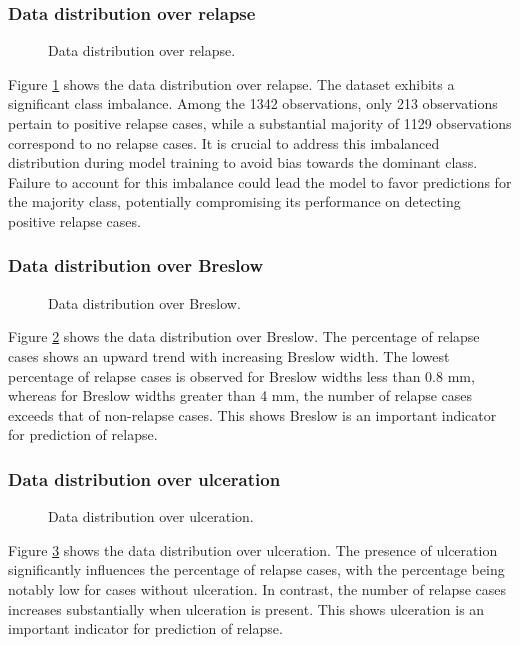 \documentclass[conference]{IEEEtran}
\begin{document}
\subsubsection{Data distribution over relapse}
\begin{figure}[h!]
  \centering
    
  \caption{Data distribution over relapse.}
  \label{fig:relapse}
\end{figure}
Figure \ref{fig:relapse} shows the data distribution over relapse. The dataset exhibits a significant class imbalance. Among the 1342 observations, only 213 observations pertain to positive relapse cases, while a substantial majority of 1129 observations correspond to no relapse cases. It is crucial to address this imbalanced distribution during model training to avoid bias towards the dominant class. Failure to account for this imbalance could lead the model to favor predictions for the majority class, potentially compromising its performance on detecting positive relapse cases.

\subsubsection{Data distribution over Breslow}
\begin{figure}[h!]
  \centering
    
  \caption{Data distribution over Breslow.}
  \label{fig:breslow}
\end{figure}

Figure \ref{fig:breslow} shows the data distribution over Breslow. The percentage of relapse cases shows an upward trend with increasing Breslow width. The lowest percentage of relapse cases is observed for Breslow widths less than 0.8 mm, whereas for Breslow widths greater than 4 mm, the number of relapse cases exceeds that of non-relapse cases. This shows Breslow is an important indicator for prediction of relapse.
\subsubsection{Data distribution over ulceration}
\begin{figure}[h!]
  \centering
    
  \caption{Data distribution over ulceration.}
  \label{fig:ulceration}
\end{figure}

Figure \ref{fig:ulceration} shows the data distribution over ulceration.  The presence of ulceration significantly influences the percentage of relapse cases, with the percentage being notably low for cases without ulceration. In contrast, the number of relapse cases increases substantially when ulceration is present. This shows ulceration is an important indicator for prediction of relapse.
\end{document}

